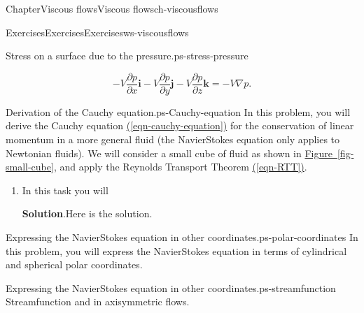 \documentclass[oneside,10pt,]{book}
\newcommand{\blocktitlefont}{\relax}
\newcommand{\xreffont}{\relax}
\numberwithin{equation}{section}
\providecommand\phantomsection{}
\newcommand{\pd}[2]{\frac{\partial#1}{\partial#2}}
\newcommand{\bi}{\boldsymbol{i}}
\newcommand{\bj}{\boldsymbol{j}}
\newcommand{\bk}{\boldsymbol{k}}
\begin{document}
\begin{chapterptx}{Chapter}{Viscous flows}{}{Viscous flows}{}{}{ch-viscousflows}
\begin{exercises-section}{Exercises}{Exercises}{}{Exercises}{}{}{ws-viscousflows}
\begin{divisionexercise}{2}{Stress on a surface due to the pressure.}{}{ps-stress-pressure}
\begin{enumerate}[font=\bfseries,label=(\alph*),ref=\alph*]
\begin{equation*}
-V\pd{p}{x}\bi-V\pd{p}{y}\bj-V\pd{p}{z}\bk=-V\nabla p.
\end{equation*}
%
\end{enumerate}%
\end{divisionexercise}%
\begin{divisionexercise}{3}{Derivation of the Cauchy equation.}{}{ps-Cauchy-equation}%
In this problem, you will derive the Cauchy equation \hyperref[eqn-cauchy-equation]{({\xreffont\ref{eqn-cauchy-equation}})} for the conservation of linear momentum in a more general fluid (the Navier\textendash{}Stokes equation only applies to Newtonian fluids). We will consider a small cube of fluid as shown in \hyperref[fig-small-cube]{Figure~{\xreffont\ref{fig-small-cube}}}, and apply the Reynolds Transport Theorem \hyperref[eqn-RTT]{({\xreffont\ref{eqn-RTT}})}.%
\begin{enumerate}[font=\bfseries,label=(\alph*),ref=\alph*]%
\item{}In this task you will%
\par\smallskip%
\noindent\textbf{\blocktitlefont Solution}.\hypertarget{ps-Cauchy-equation-3-2}{}\quad{}Here is the solution.%
\end{enumerate}%
\end{divisionexercise}%
\begin{divisionexercise}{4}{Expressing the Navier\textendash{}Stokes equation in other coordinates.}{}{ps-polar-coordinates}%
In this problem, you will express the Navier\textendash{}Stokes equation in terms of cylindrical and spherical polar coordinates.%
\end{divisionexercise}%
\begin{divisionexercise}{5}{Expressing the Navier\textendash{}Stokes equation in other coordinates.}{}{ps-streamfunction}%
Streamfunction and in axisymmetric flows.%
\end{divisionexercise}%
\end{exercises-section}
\end{chapterptx}
%
\appendix%
%
\clearpage\phantomsection%
%
%
%
\typeout{************************************************}
\typeout{************************************************}
%
\end{document}
